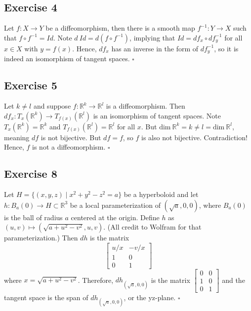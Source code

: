 \documentclass{article}
\newcommand{\R}{\mathbb{R}}
\begin{document}
\subsection*{Exercise 4}
  Let $f\colon X\to Y$ be a diffeomorphism, then there is a smooth map $f^{-1}
  \colon Y\to X$ such that $f\circ f^{-1}=Id$. Note $d\ Id=d(f\circ f^{-1})$,
  implying that $Id=df_x\circ df^{-1}_y$ for all $x\in X$ with $y=f(x)$. Hence,
  $df_x$ has an inverse in the form of $df^{-1}_y$, so it is indeed an
  isomorphism of tangent spaces.
  \hfill $\square$

\subsection*{Exercise 5}
  Let $k\ne l$ and suppose $f\colon\R^k\to\R^l$ is a diffeomorphism. Then $df_x
  \colon T_x(\R^k)\to T_{f(x)}(\R^l)$ is an isomorphism of tangent spaces. Note
  $T_x(\R^k)=\R^k$ and $T_{f(x)}(\R^l)=\R^l$ for all $x$. But $\text{dim}\ \R^k=
  k\ne l=\text{dim}\ \R^l$, meaning $df$ is not bijective. But $df=f$, so $f$ is
  also not bijective. Contradiction! Hence, $f$ is not a diffeomorphism.
  \hfill $\square$

\subsection*{Exercise 8}
  Let $H=\{(x,y,z)\mid x^2+y^2-z^2=a\}$ be a hyperboloid and let $h\colon B_a(0)
  \to H\subset\R^3$ be a local parameterization of $(\sqrt{a},0,0)$, where
  $B_a(0)$ is the ball of radius $a$ centered at the origin. Define $h$ as
  $(u,v)\mapsto(\sqrt{a+u^2-v^2},u,v)$. (All credit to Wolfram for that
  parameterization.) Then $dh$ is the matrix
  \begin{equation*}
    \begin{bmatrix}
      u/x &   -v/x  \\
      1   &   0     \\
      0   &   1
    \end{bmatrix}
  \end{equation*}
  where $x=\sqrt{a+u^2-v^2}$. Therefore, $dh_{(\sqrt{a},0,0)}$ is the matrix
  $\left[
    \begin{smallmatrix}
      0&0\\
      1&0\\
      0&1
    \end{smallmatrix}
  \right]$
  and the tangent space is the span of $dh_{(\sqrt{a},0,0)}$, or the yz-plane.
  \hfill $\square$
\end{document}
